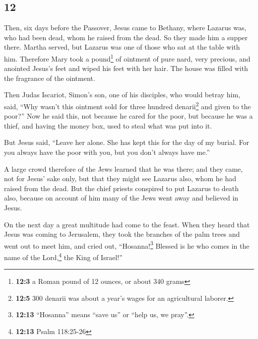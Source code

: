 \begin{paracol}{2}
\switchcolumn
\begin{otherlanguage}{english}

\hypertarget{section-23}{%
\section{12}\label{section-23}}

 Then, six days before the Passover, Jesus came to
Bethany, where Lazarus was, who had been dead, whom he raised from the
dead.  So they made him a supper there. Martha served, but
Lazarus was one of those who sat at the table with him. 
Therefore Mary took a pound\footnote{\textbf{12:3} a Roman pound of 12
  ounces, or about 340 grams} of ointment of pure nard, very precious,
and anointed Jesus's feet and wiped his feet with her hair. The house
was filled with the fragrance of the ointment.

 Then Judas Iscariot, Simon's son, one of his disciples,
who would betray him, said,  ``Why wasn't this ointment
sold for three hundred denarii\footnote{\textbf{12:5} 300 denarii was
  about a year's wages for an agricultural laborer.} and given to the
poor?''  Now he said this, not because he cared for the
poor, but because he was a thief, and having the money box, used to
steal what was put into it.

 But Jesus said, ``Leave her alone. She has kept this for
the day of my burial.  For you always have the poor with
you, but you don't always have me.''

 A large crowd therefore of the Jews learned that he was
there; and they came, not for Jesus' sake only, but that they might see
Lazarus also, whom he had raised from the dead.  But the
chief priests conspired to put Lazarus to death also, 
because on account of him many of the Jews went away and believed in
Jesus.

 On the next day a great multitude had come to the feast.
When they heard that Jesus was coming to Jerusalem,  they
took the branches of the palm trees and went out to meet him, and cried
out, ``Hosanna!\footnote{\textbf{12:13} ``Hosanna'' means ``save us'' or
  ``help us, we pray''.} Blessed is he who comes in the name of the
Lord,\footnote{\textbf{12:13} Psalm 118:25-26} the King of Israel!''


\end{otherlanguage}
\end{paracol}
